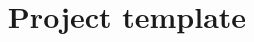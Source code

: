 \documentclass[letterpaper]{article}
\title{Project template}
\begin{document}
\maketitle	

\begin{abstract}
\end{abstract}


	

\end{document}

